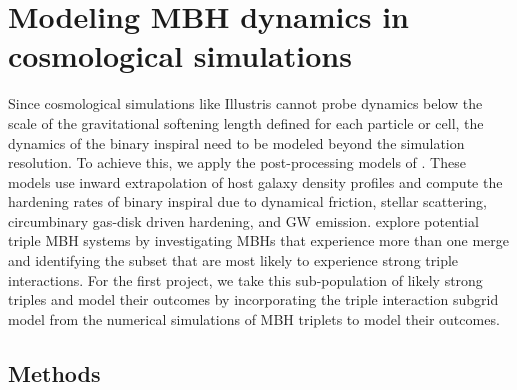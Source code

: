 \documentclass[11pt, letterpaper]{article}
\begin{document}
\section{Modeling MBH dynamics in cosmological simulations}
\label{sec:MBH-dynamics-project}

Since cosmological simulations like Illustris cannot probe dynamics below the scale of the gravitational softening length defined for each particle or cell, the dynamics of the binary inspiral need to be modeled beyond the simulation resolution. To achieve this, we apply the post-processing models of \citet{Kelley_2017a,sayeb_massive_2021}. These models use inward extrapolation of host galaxy density profiles and compute the hardening rates of binary inspiral due to dynamical friction, stellar scattering, circumbinary gas-disk driven hardening, and GW emission. \citet{sayeb_mbh_2023} explore potential triple MBH systems by investigating MBHs that experience more than one merge and identifying the subset that are most likely to experience strong triple interactions. For the first project, we take this sub-population of likely strong triples and model their outcomes by incorporating the triple interaction subgrid model from the \citet{bonetti_post-newtonian_2016,bonetti_post-newtonian_2018} numerical simulations of MBH triplets to model their outcomes.

\subsection{Methods}
\end{document}
